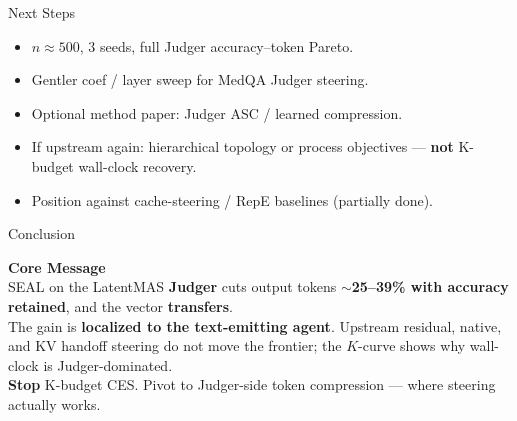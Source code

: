 \documentclass{beamer}
\begin{document}
\begin{frame}{Next Steps}
    \begin{itemize}
        \item $n{\approx}500$, 3 seeds, full Judger accuracy--token Pareto.
        \item Gentler coef / layer sweep for MedQA Judger steering.
        \item Optional method paper: Judger ASC / learned compression.
        \item If upstream again: hierarchical topology or process objectives --- \textbf{not} K-budget wall-clock recovery.
        \item Position against cache-steering / RepE baselines (partially done).
    \end{itemize}
\end{frame}

\begin{frame}{Conclusion}
    \begin{center}
        \Large \textbf{Core Message}\\[0.45cm]
        \normalsize
        SEAL on the LatentMAS \textbf{Judger} cuts output tokens \textbf{$\sim$25--39\% with accuracy retained}, and the vector \textbf{transfers}.\\[0.35cm]
        The gain is \textbf{localized to the text-emitting agent}. Upstream residual, native, and KV handoff steering do not move the frontier; the $K$-curve shows why wall-clock is Judger-dominated.\\[0.35cm]
        \textbf{Stop} K-budget CES. Pivot to Judger-side token compression --- where steering actually works.
    \end{center}
\end{frame}
\end{document}
